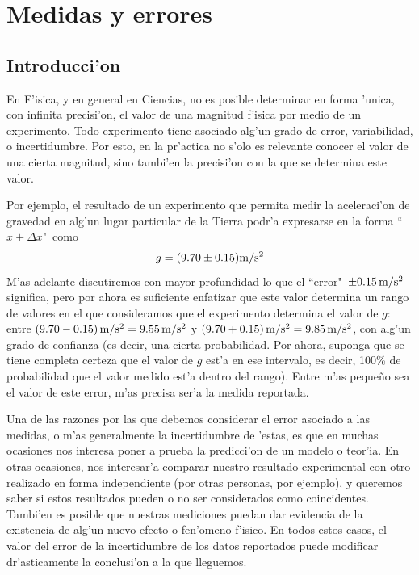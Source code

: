 \chapter{Medidas y errores}

\section{Introducci'on}

En F'isica, y en general en Ciencias, no es posible determinar en forma 'unica, con infinita precisi'on, el valor de una magnitud f'isica por medio de un experimento. Todo experimento tiene asociado alg'un grado de error, variabilidad, o incertidumbre. Por esto, en la pr'actica no s'olo es relevante conocer el valor de una cierta magnitud, sino tambi'en la precisi'on con la que se determina este valor. 

Por ejemplo, el resultado de un experimento que permita medir la aceleraci'on de gravedad en alg'un lugar particular de la Tierra podr'a expresarse en la forma ``$x\pm\Delta x$"\, como
\begin{equation}
g = (9.70\pm 0.15) {\rm m/s^2}
\end{equation}
M'as adelante discutiremos con mayor profundidad lo que el ``error"\, $\pm 0.15\rm \,m/s^2$ significa, pero por ahora es suficiente enfatizar que este valor determina un rango de valores en el que consideramos que el experimento determina el valor de $g$: entre $(9.70-0.15)\,{\rm m/s^2} = 9.55\,{\rm m/s^2}$ y $(9.70+0.15)\,{\rm m/s^2} = 9.85 \,{\rm m/s^2}$, con alg'un grado de confianza (es decir, una cierta probabilidad. Por ahora, suponga que se tiene completa certeza que el valor de $g$ est'a en ese intervalo, es decir, 100\% de probabilidad que el valor medido est'a dentro del rango). Entre m'as peque\~no sea el valor de este error, m'as precisa ser'a la medida reportada.

Una de las razones por las que debemos considerar el error asociado a las medidas, o m'as generalmente la incertidumbre de 'estas, es que en muchas ocasiones nos interesa poner a prueba la predicci'on de un modelo o teor'ia. En otras ocasiones, nos interesar'a comparar nuestro resultado experimental con otro realizado en forma independiente (por otras personas, por ejemplo), y queremos saber si estos resultados pueden o no ser considerados como coincidentes. Tambi'en es posible que nuestras mediciones puedan dar evidencia de la existencia de alg'un nuevo efecto o fen'omeno f'isico. En todos estos casos, el valor del error de la incertidumbre de los datos reportados puede modificar dr'asticamente la conclusi'on a la que lleguemos.

